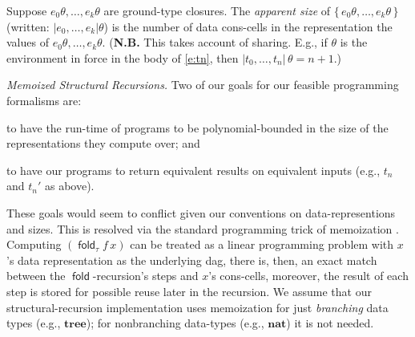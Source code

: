\documentclass[envcountsame]{llncs}
\newcommand{\key}[1]{\ensuremath{\mathop{\mathsf{#1}}\nolimits}\xspace}
\newcommand{\fold}{\key{fold}}
\newcommand{\type}[1]{\ensuremath{\mathbf{#1}}\xspace}
\newcommand{\Nat}{\type{nat}}
\newcommand{\Tree}{\type{tree}}
\newcommand{\asize}[1]{\ensuremath{\mathopen{|}#1\mathclose{|}}\xspace}
\newcommand{\set}[1]{\{\,#1\,\}}
\begin{document}
\begin{definition}\label{d:ap:size}
  Suppose $e_0\theta, \dots, e_k\theta$ are ground-type
  closures.
  The \emph{apparent size} of 
  $\set{e_0\theta, \dots, e_k\theta}$
  (written: 
  $\asize{e_0, \dots, e_k}\theta$) is
  the number of data cons-cells in the representation the values of 
  $e_0\theta,\dots,e_k\theta$.
  {(\textbf{N.B.} This takes account of sharing.  
  E.g., if  
  $\theta$ is the environment 
  in force in the body of \eqref{e:tn}, then 
  $\asize{t_0,\dots,t_n}\,\theta = n+1$.)}
\end{definition}

\emph{Memoized Structural Recursions.}
Two of our goals for our feasible programming formalisms are:
\begin{inparaenum}[\it (i)] 
  \item 
    to have the {run-time} of programs to be polynomial-bounded in 
    {the size of the representations they compute over}; and
  \item      
    to have our programs to return equivalent results on 
    equivalent inputs (e.g., $t_n$ and $t_n'$ as above).  
\end{inparaenum}
These goals would seem to conflict given our conventions on
data-re\-pre\-sentions and sizes.  This is resolved via the standard
programming trick of memoization \cite{AbelsonSussman}.  Computing
$(\fold_\tau f\,x)$ can be treated as a linear programming problem
with $x$'s data representation as the underlying dag,  there is,
then, an exact match between the $\fold$-recursion's steps and $x$'s
cons-cells, moreover, the result of each step is stored for possible reuse
later in the recursion.  We assume that our structural-recursion
implementation uses memoization for just \emph{branching} data types
(e.g., $\Tree$); for nonbranching data-types (e.g., $\Nat$) it is
not needed.
\end{document}
